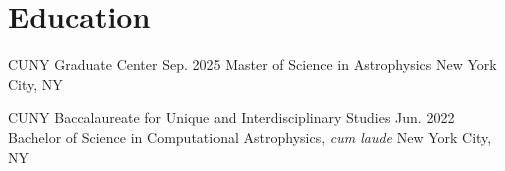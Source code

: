 \section{Education}
\resumeSubHeadingListStart

  \resumeSubheading
    {CUNY Graduate Center}
    {Sep. 2025}
    {Master of Science in Astrophysics}
    {New York City, NY}

  \resumeSubheading
    {CUNY Baccalaureate for Unique and Interdisciplinary Studies}
    {Jun. 2022}
    {Bachelor of Science in Computational Astrophysics, \textit{cum laude}}
    {New York City, NY}

\resumeSubHeadingListEnd
